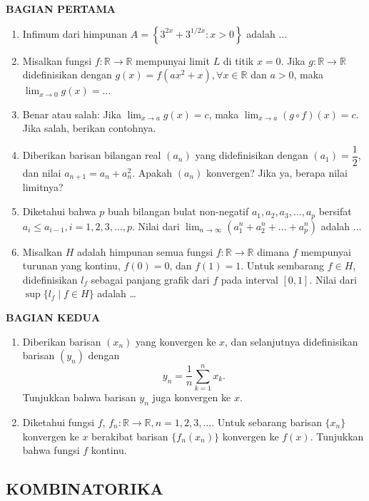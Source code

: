 \documentclass[12pt,twoside]{article}
\begin{document}
\textbf{BAGIAN PERTAMA}
\begin{enumerate}
	\item Infimum dari himpunan $A=\left\lbrace 3^{2x}+3^{1/2x}: x>0\right\rbrace$ adalah $\dots$
	\item Misalkan fungsi $f:\mathbb{R}\to \mathbb{R}$ mempunyai limit $L$ di titik $x=0$. Jika $g:\mathbb{R}\to \mathbb{R}$ didefinisikan dengan $g(x)=f(ax^2+x),\forall x\in \mathbb{R}$ dan $a>0$, maka $\displaystyle\lim_{x\to 0}g(x)=\dots$

	\item Benar atau salah: Jika $\displaystyle \lim_{x\to a}g(x)=c$, maka $\displaystyle\lim_{x\to a}(g\circ f)(x)=c$. Jika salah, berikan contohnya.

	\item Diberikan barisan bilangan real $(a_n)$ yang didefinisikan dengan $(a_1)=\dfrac{1}{2}$, dan nilai $a_{n+1}=a_n+a_{n}^2$. Apakah $(a_n)$ konvergen? Jika ya, berapa nilai limitnya?

	\item Diketahui bahwa $p$ buah bilangan bulat non-negatif $a_1,a_2,a_3,\dots,a_p$ bersifat $a_i\leq a_{i-1}, i=1,2,3,\dots,p$. Nilai dari $\displaystyle\lim_{n\to \infty}\left(a_{1}^{n}+a_2^n+\dots+a_p^n\right)$ adalah $\dots$

	\item Misalkan $H$ adalah himpunan semua fungsi $f:\mathbb{R}\to \mathbb{R}$ dimana $f$ mempunyai turunan yang kontinu, $f(0)=0$, dan $f(1)=1$. Untuk sembarang $f\in H$, didefinisikan $l_f$ sebagai panjang grafik dari $f$ pada interval $[0,1]$. Nilai dari $\sup\{l_f\mid f\in H\}$ adalah \dots
\end{enumerate}

\newpage \textbf{BAGIAN KEDUA}
\begin{enumerate}
	\item Diberikan barisan $(x_n)$ yang konvergen ke $x$, dan selanjutnya didefinisikan barisan $(y_n)$ dengan
	      $$y_n=\dfrac{1}{n}\displaystyle\sum_{k=1}^{n}x_k.$$
	      Tunjukkan bahwa barisan $y_n$ juga konvergen ke $x$.

	\item Diketahui fungsi $f$, $f_n:\mathbb{R}\to \mathbb{R}, 	n=1,2,3,\dots$. Untuk sebarang barisan $\{x_n\}$ konvergen ke $x$ berakibat barisan $\{f_n(x_n)\}$ konvergen ke $f(x)$. Tunjukkan bahwa fungsi $f$ kontinu.

\end{enumerate}

\newpage \subsection{KOMBINATORIKA}
\end{document}
